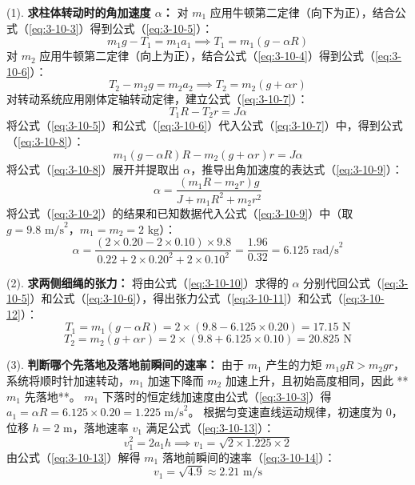 (1). \textbf{求柱体转动时的角加速度 $\alpha$：}
对 $m_1$ 应用牛顿第二定律（向下为正），结合公式（\ref{eq:3-10-3}）得到公式（\ref{eq:3-10-5}）：
\begin{equation}\label{eq:3-10-5}
	m_1 g - T_1 = m_1 a_1 \implies T_1 = m_1(g - \alpha R)
\end{equation}
对 $m_2$ 应用牛顿第二定律（向上为正），结合公式（\ref{eq:3-10-4}）得到公式（\ref{eq:3-10-6}）：
\begin{equation}\label{eq:3-10-6}
	T_2 - m_2 g = m_2 a_2 \implies T_2 = m_2(g + \alpha r)
\end{equation}
对转动系统应用刚体定轴转动定律，建立公式（\ref{eq:3-10-7}）：
\begin{equation}\label{eq:3-10-7}
	T_1 R - T_2 r = J \alpha
\end{equation}
将公式（\ref{eq:3-10-5}）和公式（\ref{eq:3-10-6}）代入公式（\ref{eq:3-10-7}）中，得到公式（\ref{eq:3-10-8}）：
\begin{equation}\label{eq:3-10-8}
	m_1(g - \alpha R)R - m_2(g + \alpha r)r = J \alpha
\end{equation}
将公式（\ref{eq:3-10-8}）展开并提取出 $\alpha$，推导出角加速度的表达式（\ref{eq:3-10-9}）：
\begin{equation}\label{eq:3-10-9}
	\alpha = \frac{(m_1 R - m_2 r)g}{J + m_1 R^2 + m_2 r^2}
\end{equation}
将公式（\ref{eq:3-10-2}）的结果和已知数据代入公式（\ref{eq:3-10-9}）中（取 $g = 9.8 \text{ m/s}^2$，$m_1 = m_2 = 2 \text{ kg}$）：
\begin{equation}\label{eq:3-10-10}
	\alpha = \frac{(2 \times 0.20 - 2 \times 0.10) \times 9.8}{0.22 + 2 \times 0.20^2 + 2 \times 0.10^2} = \frac{1.96}{0.32} = 6.125 \text{ rad/s}^2
\end{equation}

(2). \textbf{求两侧细绳的张力：}
将由公式（\ref{eq:3-10-10}）求得的 $\alpha$ 分别代回公式（\ref{eq:3-10-5}）和公式（\ref{eq:3-10-6}），得出张力公式（\ref{eq:3-10-11}）和公式（\ref{eq:3-10-12}）：
\begin{equation}\label{eq:3-10-11}
	T_1 = m_1(g - \alpha R) = 2 \times (9.8 - 6.125 \times 0.20) = 17.15 \text{ N}
\end{equation}
\begin{equation}\label{eq:3-10-12}
	T_2 = m_2(g + \alpha r) = 2 \times (9.8 + 6.125 \times 0.10) = 20.825 \text{ N}
\end{equation}

(3). \textbf{判断哪个先落地及落地前瞬间的速率：}
由于 $m_1$ 产生的力矩 $m_1 g R > m_2 g r$，系统将顺时针加速转动，$m_1$ 加速下降而 $m_2$ 加速上升，且初始高度相同，因此 **$m_1$ 先落地**。
$m_1$ 下落时的恒定线加速度由公式（\ref{eq:3-10-3}）得 $a_1 = \alpha R = 6.125 \times 0.20 = 1.225 \text{ m/s}^2$。
根据匀变速直线运动规律，初速度为 $0$，位移 $h = 2 \text{ m}$，落地速率 $v_1$ 满足公式（\ref{eq:3-10-13}）：
\begin{equation}\label{eq:3-10-13}
	v_1^2 = 2 a_1 h \implies v_1 = \sqrt{2 \times 1.225 \times 2}
\end{equation}
由公式（\ref{eq:3-10-13}）解得 $m_1$ 落地前瞬间的速率（\ref{eq:3-10-14}）：
\begin{equation}\label{eq:3-10-14}
	v_1 = \sqrt{4.9} \approx 2.21 \text{ m/s}
\end{equation}

